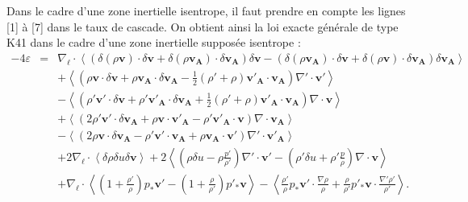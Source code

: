 Dans le cadre d'une zone inertielle isentrope, il faut prendre en compte les lignes [1] à [7] dans le taux de cascade. On obtient ainsi la \og loi exacte générale de type \acs{K41} dans le cadre d'une zone inertielle supposée isentrope \fg{} : 
\begin{equation}
\boxed{
\begin{array}{lcl}
\label{eq:turb_elg_f1} -4\varepsilon &=& \nabla_{\boldsymbol{\ell}} \cdot \left<\left(\delta \left(\rho\boldsymbol{v}\right) \cdot \delta \boldsymbol{v}+ \delta \left(\rho\boldsymbol{v_A}\right) \cdot \delta \boldsymbol{v_A} \right)\delta \boldsymbol{v}  -\left(\delta \left(\rho\boldsymbol{v_A}\right) \cdot \delta \boldsymbol{v}  + \delta \left(\rho\boldsymbol{v}\right) \cdot \delta \boldsymbol{v_A}  \right) \delta \boldsymbol{v_A} \right>\\
&& +\left< \left(\rho \boldsymbol{v} \cdot \delta \boldsymbol{v} +\rho \boldsymbol{v_A} \cdot \delta \boldsymbol{v_A} -\frac{1}{2} \left(\rho'+\rho\right) \boldsymbol{v'_A} \cdot \boldsymbol{v_A} \right) \nabla' \cdot \boldsymbol{v'} \right>\\
&& -\left< \left(\rho' \boldsymbol{v'} \cdot \delta \boldsymbol{v} + \rho' \boldsymbol{v'_A} \cdot \delta \boldsymbol{v_A} + \frac{1}{2} \left(\rho'+\rho\right) \boldsymbol{v'_A} \cdot \boldsymbol{v_A}  \right)\nabla \cdot \boldsymbol{v}\right>\\
&&+ \left<\left(2 \rho' \boldsymbol{v'} \cdot \delta \boldsymbol{v_A}+\rho \boldsymbol{v} \cdot \boldsymbol{v'_A} - \rho' \boldsymbol{v'_A} \cdot \boldsymbol{v}  \right)\nabla \cdot \boldsymbol{v_A}\right>\\
&&- \left<\left(2\rho \boldsymbol{v} \cdot \delta \boldsymbol{v_A} -\rho' \boldsymbol{v'} \cdot \boldsymbol{v_A} +  \rho \boldsymbol{v_A} \cdot \boldsymbol{v'} \right)\nabla' \cdot \boldsymbol{v'_A}\right> \\
&&+ 2 \nabla_{\boldsymbol{\ell}} \cdot \left<\delta \rho  \delta u \delta \boldsymbol{v}\right> + 2\left<\left(\rho \delta u- \rho \frac{p'}{\rho'}\right)\nabla' \cdot \boldsymbol{v'}  - \left(\rho' \delta u + \rho' \frac{p}{\rho}\right) \nabla \cdot \boldsymbol{v} \right>\\
&&+  \nabla_{\boldsymbol{\ell}} \cdot \left< \left(1+\frac{\rho'}{\rho}\right)p_*  \boldsymbol{v'} -  \left(1+\frac{\rho}{\rho'}\right)p'_*  \boldsymbol{v} \right>- \left<\frac{\rho'}{\rho} p_*  \boldsymbol{v'} \cdot \frac{\nabla \rho}{\rho} + \frac{\rho}{\rho'} p'_*  \boldsymbol{v} \cdot \frac{\nabla' \rho'}{\rho'} \right>.
\end{array}}
\end{equation} 


